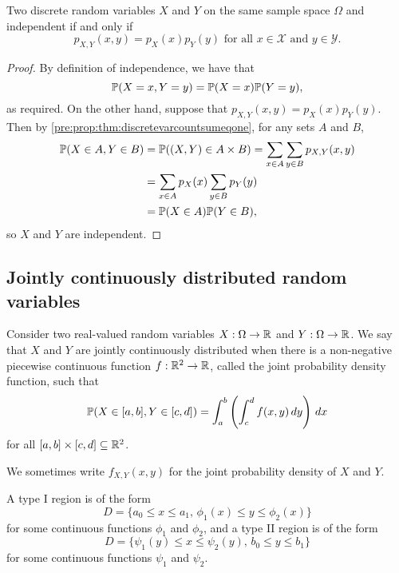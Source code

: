 \documentclass[10pt, a4paper]{article}
\begin{document}
\begin{lemma}
    Two discrete random variables $X$ and $Y$ on the same sample space $\Omega$ and independent if and only if
    \[
    p_{X, Y}(x, y) = p_X(x)p_Y(y)\text{ for all } x \in \mathcal{X}\text{ and } y \in \mathcal{Y}.
    \]
    \begin{proof}
        By definition of independence,
        we have that
        \[
        \P(X = x, Y = y) = \P(X = x)\P(Y = y),
        \]
        as required.
        On the other hand,
        suppose that $p_{X, Y}(x, y) = p_X(x)p_Y(y)$.
        Then by \autoref{pre:prop:thm:discretevarcountsumeqone},
        for any sets $A$ and $B$,
        \begin{align*}
            \P(X \in A, Y \in B) &= \P((X, Y) \in A \times B) = \sum_{x \in A}\sum_{y \in B}p_{X, Y}(x, y) \\
            &= \sum_{x \in A}p_X(x)\sum_{y \in B}p_Y(y) \\
            &= \P(X \in A)\P(Y \in B),
        \end{align*}
        so $X$ and $Y$ are independent.
    \end{proof}
\end{lemma}

\subsection{Jointly continuously distributed random variables}
\begin{definition}
    Consider two real-valued random variables $X : \Omega \rightarrow \R$ and $Y : \Omega \rightarrow \R$.
    We say that $X$ and $Y$ are jointly continuously distributed when there is a non-negative piecewise continuous function $f: \R ^ 2 \rightarrow \R$,
    called the joint probability density function,
    such that
    \[
    \P(X \in [a, b], Y \in [c, d]) = \int_a^b\left(\int_c^d f(x, y)\,dy\right)\,dx
    \]
    for all $[a, b] \times [c, d] \subseteq \R ^ 2$.
\end{definition}

We sometimes write $f_{X, Y}(x, y)$ for the joint probability density of $X$ and $Y$.

A type I region is of the form
\[
D = \{a_0 \leq x \leq a_1,\, \phi_1(x) \leq y \leq \phi_2(x)\}
\]
for some continuous functions $\phi_1$ and $\phi_2$,
and a type II region is of the form
\[
D = \{\psi_1(y) \leq x \leq \psi_2(y),\, b_0 \leq y \leq b_1\}
\]
for some continuous functions $\psi_1$ and $\psi_2$.
\end{document}
